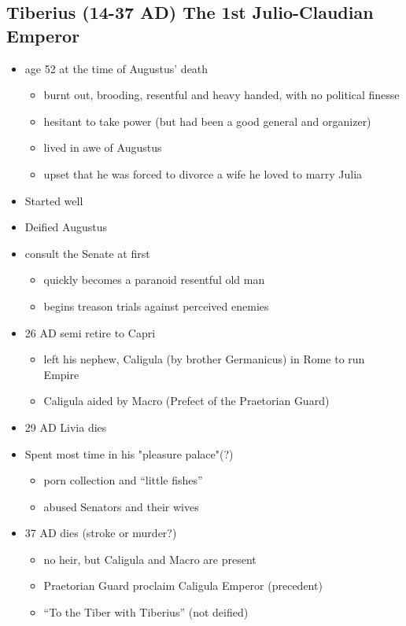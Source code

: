 \documentclass[12pt, twoside]{article}
\begin{document}
\subsection{Tiberius (14-37 AD) The 1st Julio-Claudian Emperor}
\begin{itemize}
\item age 52 at the time of Augustus’ death
	\begin{itemize}
	\item burnt out, brooding, resentful and heavy handed, with no political finesse
	\item hesitant to take power (but had been a good general and organizer)
	\item lived in awe of Augustus
	\item upset that he was forced to divorce a wife he loved to marry Julia
	\end{itemize}
\item Started well
\item Deified Augustus
\item consult the Senate at first
	\begin{itemize}
	\item quickly becomes a paranoid resentful old man
	\item begins treason trials against perceived enemies
	\end{itemize}
\item 26 AD semi retire to Capri
	\begin{itemize}
	\item left his nephew, Caligula (by brother Germanicus) in Rome to run Empire
	\item Caligula aided by Macro (Prefect of the Praetorian Guard)
	\end{itemize}
\item 29 AD Livia dies
\item Spent most time in his "pleasure palace"(?)
	\begin{itemize}
	\item porn collection and “little fishes”
	\item abused Senators and their wives
	\end{itemize}
\item 37 AD dies (stroke or murder?)
	\begin{itemize}
	\item no heir, but Caligula and Macro are present
	\item Praetorian Guard proclaim Caligula Emperor (precedent)
	\item “To the Tiber with Tiberius” (not deified)
	\end{itemize}
\end{itemize}
\end{document}
